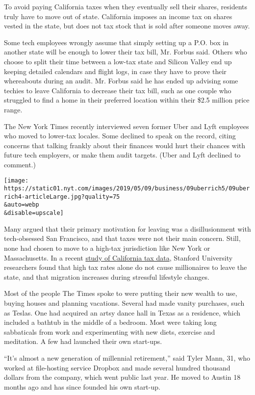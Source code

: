 To avoid paying California taxes when they eventually sell their shares,
residents truly have to move out of state. California imposes an income
tax on shares vested in the state, but does not tax stock that is sold
after someone moves away.

Some tech employees wrongly assume that simply setting up a P.O. box in
another state will be enough to lower their tax bill, Mr. Forbus said.
Others who choose to split their time between a low-tax state and
Silicon Valley end up keeping detailed calendars and flight logs, in
case they have to prove their whereabouts during an audit. Mr. Forbus
said he has ended up advising some techies to leave California to
decrease their tax bill, such as one couple who struggled to find a home
in their preferred location within their \$2.5 million price range.

The New York Times recently interviewed seven former Uber and Lyft
employees who moved to lower-tax locales. Some declined to speak on the
record, citing concerns that talking frankly about their finances would
hurt their chances with future tech employers, or make them audit
targets. (Uber and Lyft declined to comment.)

\texttt{[image: https://static01.nyt.com/images/2019/05/09/business/09uberrich5/09uberrich4-articleLarge.jpg?quality=75\\\&auto=webp\\\&disable=upscale]}

Many argued that their primary motivation for leaving was a
disillusionment with tech-obsessed San Francisco, and that taxes were
not their main concern. Still, none had chosen to move to a high-tax
jurisdiction like New York or Massachusetts. In a recent
\href{https://inequality.stanford.edu/sites/default/files/millionaire-migration-california-impact-top-tax-rates.pdf}{study
of California tax data}, Stanford University researchers found that high
tax rates alone do not cause millionaires to leave the state, and that
migration increases during stressful lifestyle changes.

Most of the people The Times spoke to were putting their new wealth to
use, buying houses and planning vacations. Several had made vanity
purchases, such as Teslas. One had acquired an artsy dance hall in Texas
as a residence, which included a bathtub in the middle of a bedroom.
Most were taking long sabbaticals from work and experimenting with new
diets, exercise and meditation. A few had launched their own start-ups.

``It's almost a new generation of millennial retirement,'' said Tyler
Mann, 31, who worked at file-hosting service Dropbox and made several
hundred thousand dollars from the company, which went public last year.
He moved to Austin 18 months ago and has since founded his own start-up.

